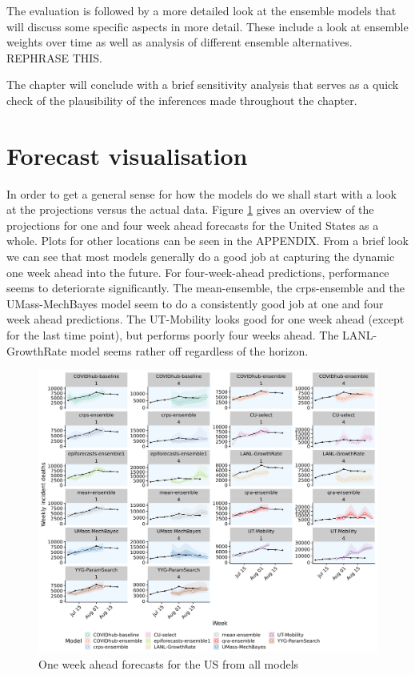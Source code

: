 \documentclass[
]{book}
\begin{document}
The evaluation is followed by a more detailed look at the ensemble models that will discuss some specific aspects in more detail. These include a look at ensemble weights over time as well as analysis of different ensemble alternatives. REPHRASE THIS.

The chapter will conclude with a brief sensitivity analysis that serves as a quick check of the plausibility of the inferences made throughout the chapter.

\hypertarget{forecast-visualisation}{%
\section{Forecast visualisation}\label{forecast-visualisation}}

In order to get a general sense for how the models do we shall start with a look at the projections versus the actual data. Figure \ref{fig:models-us} gives an overview of the projections for one and four week ahead forecasts for the United States as a whole. Plots for other locations can be seen in the APPENDIX. From a brief look we can see that most models generally do a good job at capturing the dynamic one week ahead into the future. For four-week-ahead predictions, performance seems to deteriorate significantly. The mean-ensemble, the crps-ensemble and the UMass-MechBayes model seem to do a consistently good job at one and four week ahead predictions. The UT-Mobility looks good for one week ahead (except for the last time point), but performs poorly four weeks ahead. The LANL-GrowthRate model seems rather off regardless of the horizon.

\begin{figure}
\includegraphics[width=1\linewidth]{../visualisation/chapter-5-results/US-forecast-1-4-wk-ahead} \caption{One week ahead forecasts for the US from all models}\label{fig:models-us}
\end{figure}
\end{document}
